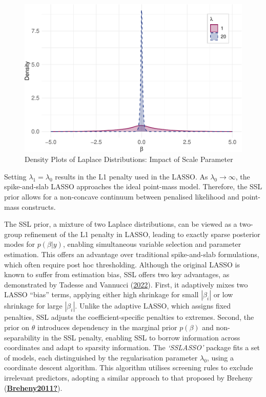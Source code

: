 \documentclass[
  11pt,
]{article}
\begin{document}
\begin{figure}

{\centering \includegraphics[width=0.75\linewidth]{dissertation_files/figure-latex/SSLASSO Priors-1} 

}

\caption{Density Plots of Laplace Distributions: Impact of Scale Parameter}\label{fig:SSLASSO Priors}
\end{figure}

Setting \(\lambda_1 = \lambda_0\) results in the L1 penalty used in the
LASSO. As \(\lambda_0 \rightarrow \infty\), the spike-and-slab LASSO
approaches the ideal point-mass model. Therefore, the SSL prior allows
for a non-concave continuum between penalised likelihood and point-mass
constructs.

The SSL prior, a mixture of two Laplace distributions, can be viewed as
a two-group refinement of the L1 penalty in LASSO, leading to exactly
sparse posterior modes for \(p(\beta | y)\), enabling simultaneous
variable selection and parameter estimation. This offers an advantage
over traditional spike-and-slab formulations, which often require post
hoc thresholding. Although the original LASSO is known to suffer from
estimation bias, SSL offers two key advantages, as demonstrated by
Tadesse and Vannucci (\protect\hyperlink{ref-Tadesse2022}{2022}). First,
it adaptively mixes two LASSO ``bias'' terms, applying either high
shrinkage for small \(|\beta_i|\) or low shrinkage for large
\(|\beta_i|\). Unlike the adaptive LASSO, which assigns fixed penalties,
SSL adjusts the coefficient-specific penalties to extremes. Second, the
prior on \(\theta\) introduces dependency in the marginal prior
\(p(\beta)\) and non-separability in the SSL penalty, enabling SSL to
borrow information across coordinates and adapt to sparsity information.
The \emph{`SSLASSO'} package fits a set of models, each distinguished by
the regularisation parameter \(\lambda_0\), using a coordinate descent
algorithm. This algorithm utilises screening rules to exclude irrelevant
predictors, adopting a similar approach to that proposed by Breheny
(\protect\hyperlink{ref-Breheny2011}{\textbf{Breheny2011?}}).
\end{document}
